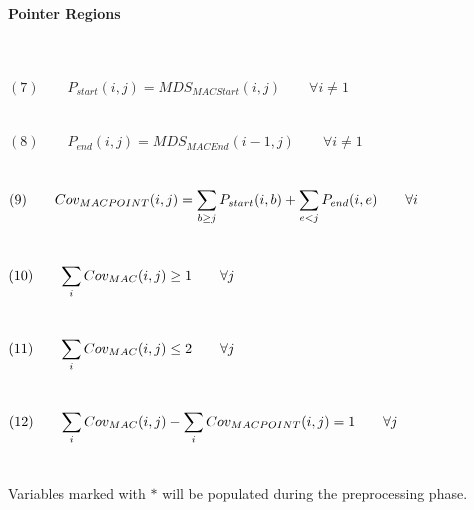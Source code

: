 \paragraph{Pointer Regions} $ $
\\\\\\
$(7) \qquad P_{start}(i,j) = MDS_{MACStart}(i,j) \qquad \forall i \neq 1$ \\\\\\
$(8) \qquad P_{end}(i,j) = MDS_{MACEnd}(i-1,j) \qquad \forall i \neq 1$ \\\\\\
$(9) \qquad Cov_{MACPOINT}(i,j) = \mathlarger{\sum_{b \geq j} P_{start}(i,b) + \sum_{e < j} P_{end}(i,e) \qquad \forall i}$ \\\\\\
$(10) \qquad \mathlarger{\sum_{i} Cov_{MAC}(i,j) \geq 1 \qquad \forall j }$ \\\\\\
$(11) \qquad \mathlarger{\sum_{i} Cov_{MAC}(i,j) \leq 2 \qquad \forall j }$ \\\\\\
$(12) \qquad \mathlarger{\sum_{i} Cov_{MAC}(i,j) - \sum_{i} Cov_{MACPOINT}(i,j) = 1 \qquad \forall j}$ \\\\\\

Variables marked with $*$ will be populated during the preprocessing phase. \\\\\\

